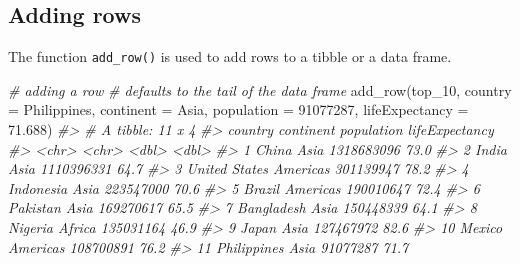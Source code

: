 \documentclass[
]{book}
\newenvironment{Shaded}{\begin{snugshade}}{\end{snugshade}}
\newcommand{\AttributeTok}[1]{\textcolor[rgb]{0.77,0.63,0.00}{#1}}
\newcommand{\CommentTok}[1]{\textcolor[rgb]{0.56,0.35,0.01}{\textit{#1}}}
\newcommand{\DecValTok}[1]{\textcolor[rgb]{0.00,0.00,0.81}{#1}}
\newcommand{\FloatTok}[1]{\textcolor[rgb]{0.00,0.00,0.81}{#1}}
\newcommand{\FunctionTok}[1]{\textcolor[rgb]{0.00,0.00,0.00}{#1}}
\newcommand{\NormalTok}[1]{#1}
\newcommand{\StringTok}[1]{\textcolor[rgb]{0.31,0.60,0.02}{#1}}
\begin{document}
\hypertarget{adding-rows-1}{%
\subsection{Adding rows}\label{adding-rows-1}}

The function \texttt{add\_row()} is used to add rows to a tibble or a data frame.

\begin{Shaded}
\begin{Highlighting}[]
\CommentTok{\# adding a row}
\CommentTok{\# defaults to the tail of the data frame}
\FunctionTok{add\_row}\NormalTok{(top\_10, }
        \AttributeTok{country =} \StringTok{\textquotesingle{}Philippines\textquotesingle{}}\NormalTok{,}
        \AttributeTok{continent =} \StringTok{\textquotesingle{}Asia\textquotesingle{}}\NormalTok{, }
        \AttributeTok{population =} \DecValTok{91077287}\NormalTok{, }
        \AttributeTok{lifeExpectancy =} \FloatTok{71.688}\NormalTok{)}
\CommentTok{\#\textgreater{} \# A tibble: 11 x 4}
\CommentTok{\#\textgreater{}    country       continent population lifeExpectancy}
\CommentTok{\#\textgreater{}    \textless{}chr\textgreater{}         \textless{}chr\textgreater{}          \textless{}dbl\textgreater{}          \textless{}dbl\textgreater{}}
\CommentTok{\#\textgreater{}  1 China         Asia      1318683096           73.0}
\CommentTok{\#\textgreater{}  2 India         Asia      1110396331           64.7}
\CommentTok{\#\textgreater{}  3 United States Americas   301139947           78.2}
\CommentTok{\#\textgreater{}  4 Indonesia     Asia       223547000           70.6}
\CommentTok{\#\textgreater{}  5 Brazil        Americas   190010647           72.4}
\CommentTok{\#\textgreater{}  6 Pakistan      Asia       169270617           65.5}
\CommentTok{\#\textgreater{}  7 Bangladesh    Asia       150448339           64.1}
\CommentTok{\#\textgreater{}  8 Nigeria       Africa     135031164           46.9}
\CommentTok{\#\textgreater{}  9 Japan         Asia       127467972           82.6}
\CommentTok{\#\textgreater{} 10 Mexico        Americas   108700891           76.2}
\CommentTok{\#\textgreater{} 11 Philippines   Asia        91077287           71.7}


\end{Highlighting}
\end{Shaded}
\end{document}
